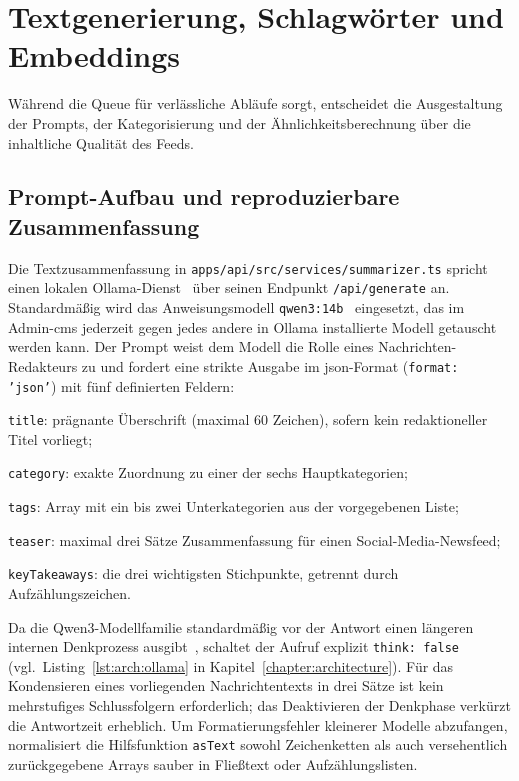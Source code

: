 \section{Textgenerierung, Schlagwörter und Embeddings}\label{sec:backend:llm}
\setauthor{\firstauthor}

Während die Queue für verlässliche Abläufe sorgt, entscheidet die Ausgestaltung der Prompts, der Kategorisierung und der Ähnlichkeitsberechnung über die inhaltliche Qualität des Feeds.

\subsection{Prompt-Aufbau und reproduzierbare Zusammenfassung}

Die Textzusammenfassung in \texttt{apps/api/src/services/summarizer.ts} spricht einen lokalen Ollama-Dienst~\cite{ollama} über seinen Endpunkt \texttt{/api/generate} an.
Standardmäßig wird das Anweisungsmodell \texttt{qwen3:14b}~\cite{qwen2025qwen3} eingesetzt, das im Admin-\gls{cms} jederzeit gegen jedes andere in Ollama installierte Modell getauscht werden kann.
Der Prompt weist dem Modell die Rolle eines Nachrichten-Redakteurs zu und fordert eine strikte Ausgabe im \gls{json}-Format (\texttt{format: 'json'}) mit fünf definierten Feldern:
\begin{compactitem}
    \item \texttt{title}: prägnante Überschrift (maximal 60 Zeichen), sofern kein redaktioneller Titel vorliegt;
    \item \texttt{category}: exakte Zuordnung zu einer der sechs Hauptkategorien;
    \item \texttt{tags}: Array mit ein bis zwei Unterkategorien aus der vorgegebenen Liste;
    \item \texttt{teaser}: maximal drei Sätze Zusammenfassung für einen Social-Media-Newsfeed;
    \item \texttt{keyTakeaways}: die drei wichtigsten Stichpunkte, getrennt durch Aufzählungszeichen.
\end{compactitem}

Da die Qwen3-Modellfamilie standardmäßig vor der Antwort einen längeren internen Denkprozess ausgibt~\cite{qwen2025qwen3}, schaltet der Aufruf explizit \texttt{think: false} (vgl.\ Listing~\ref{lst:arch:ollama} in Kapitel~\ref{chapter:architecture}).
Für das Kondensieren eines vorliegenden Nachrichtentexts in drei Sätze ist kein mehrstufiges Schlussfolgern erforderlich; das Deaktivieren der Denkphase verkürzt die Antwortzeit erheblich.
Um Formatierungsfehler kleinerer Modelle abzufangen, normalisiert die Hilfsfunktion \texttt{asText} sowohl Zeichenketten als auch versehentlich zurückgegebene Arrays sauber in Fließtext oder Aufzählungslisten.

